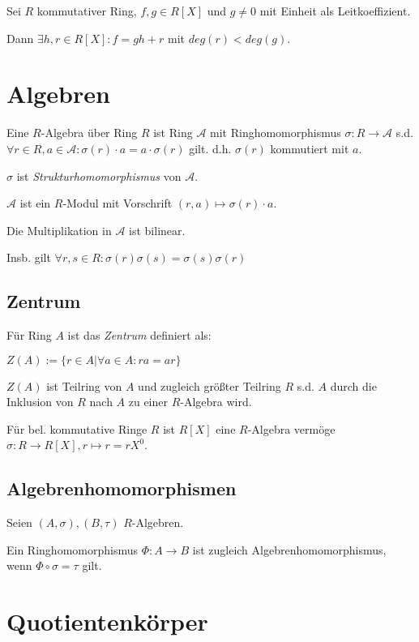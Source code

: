 Sei $R$ kommutativer Ring, $f, g \in R[X]$ und $g \neq 0$ mit Einheit als Leitkoeffizient.

Dann $\exists h, r \in R[X] : f = gh+r$ mit $deg(r) < deg(g)$.

\section*{Algebren}

\newcommand{\A}{\mathcal{A}}

Eine $R$-Algebra über Ring $R$ ist Ring $\A$ mit Ringhomomorphismus $\sigma : R \to \A$ s.d. $\forall r \in R, a \in \A : \sigma(r) \cdot a = a \cdot \sigma(r)$ gilt. d.h. $\sigma(r)$ kommutiert mit $a$.

$\sigma$ ist \emph{Strukturhomomorphismus} von $\A$.

$\A$ ist ein $R$-Modul mit Vorschrift $(r,a) \mapsto \sigma(r) \cdot a$.

Die Multiplikation in $\A$ ist bilinear.

Insb. gilt $\forall r, s \in R : \sigma(r)\sigma(s) = \sigma(s)\sigma(r)$

\subsection*{Zentrum}

Für Ring $A$ ist das \emph{Zentrum} definiert als:

$Z(A) := \{ r \in A | \forall a \in A : ra=ar \}$

$Z(A)$ ist Teilring von $A$ und zugleich größter Teilring $R$ s.d. $A$ durch die Inklusion von $R$ nach $A$ zu einer $R$-Algebra wird.

\vspace*{2mm}

Für bel. kommutative Ringe $R$ ist $R[X]$ eine $R$-Algebra vermöge $\sigma : R \to R[X], r \mapsto r = rX^0$.

\subsection*{Algebrenhomomorphismen}

Seien $(A, \sigma), (B, \tau)$ $R$-Algebren.

Ein Ringhomomorphismus $\Phi : A \to B$ ist zugleich Algebrenhomomorphismus, wenn $\Phi \circ \sigma = \tau$ gilt.

\section*{Quotientenkörper}


